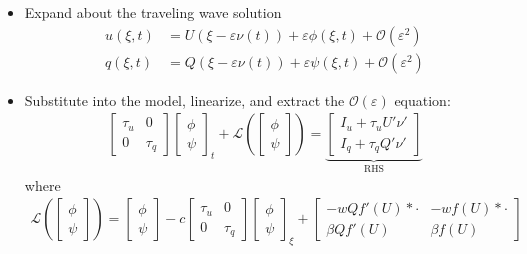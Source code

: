 \documentclass[landscape,final]{baposter}
\newcommand{\LL}{\mathcal{L}}
\newcommand{\OO}{\mathcal{O}}
\begin{document}
\begin{poster}
{
	\begin{itemize}
		\item Expand about the traveling wave solution
		\begin{align*}
			u(\xi, t) &= U(\xi - \varepsilon \nu(t)) + \varepsilon \phi(\xi, t) + \OO(\varepsilon^2) \\
			q(\xi, t) &= Q(\xi - \varepsilon \nu(t)) + \varepsilon \psi(\xi, t) + \OO(\varepsilon^2)
		\end{align*}
		\item Substitute into the model, linearize, and extract the $\OO(\varepsilon)$ equation:
		\begin{align*}
   		\begin{bmatrix}\tau_u & 0 \\ 0 & \tau_q\end{bmatrix} \begin{bmatrix}\phi \\ \psi \end{bmatrix}_t + \LL \left(\begin{bmatrix} \phi \\ \psi \end{bmatrix} \right)
       = 
       \underbrace{\begin{bmatrix} I_u + \tau_u U' \nu' \\ I_q + \tau_q Q' \nu ' \end{bmatrix}}_{\text{RHS}}
		\end{align*}
		where
		\begin{align*}
		\LL \left(\begin{bmatrix} \phi \\ \psi \end{bmatrix} \right) = \begin{bmatrix}\phi \\ \psi \end{bmatrix} - c\begin{bmatrix}\tau_u & 0 \\ 0 & \tau_q\end{bmatrix} \begin{bmatrix}\phi \\ \psi \end{bmatrix}_\xi +
		\begin{bmatrix}
  -w Q f'(U) * \cdot  & -w f(U) * \cdot \\
  \beta Q f'(U) & \beta f(U)
		\end{bmatrix}

\end{align*}
\end{itemize}}
\end{poster}
\end{document}
